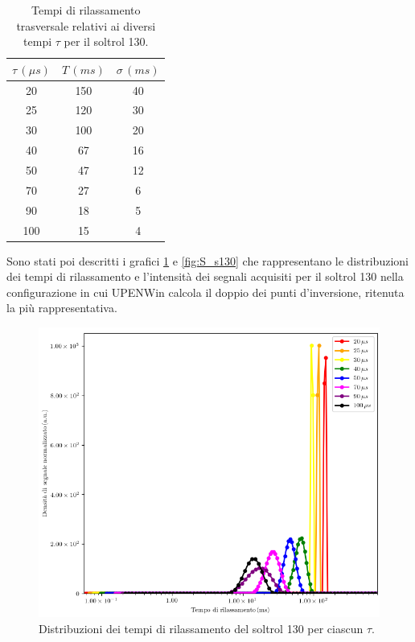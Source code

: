 \begin{table}
    \begin{center}
    \begin{tabular}{c c c}
    \toprule
    	${\tau}\,({\mu}s)$ & $T\,(ms)$ & ${\sigma}\,(ms)$ \\
    \midrule
	 20 & 150 & 40 \\
	 25 & 120 & 30 \\
	 30 & 100 & 20 \\
	 40 & 67 & 16 \\
	 50 & 47 & 12 \\
	 70 & 27 & 6 \\
	 90 & 18 & 5 \\
	 100 & 15 & 4 \\
    \bottomrule
    \end{tabular}
    \caption{Tempi di rilassamento trasversale relativi ai diversi tempi $\tau$ per il soltrol 130.}
    \label{tab:T_s130}
    \end{center}
\end{table}
\newpage
Sono stati poi descritti i grafici \ref{fig:D_s130} e \ref{fig:S_s130} che rappresentano le distribuzioni dei tempi di rilassamento e l'intensità dei segnali acquisiti per il soltrol 130 nella configurazione in cui UPENWin calcola il doppio dei punti d'inversione, ritenuta la più rappresentativa.

\begin{figure}[p]
\centering
\includegraphics[width=\columnwidth]{Figure/SOLTROL130.png}
\caption{Distribuzioni dei tempi di rilassamento del soltrol 130 per ciascun $\tau$.}
\label{fig:D_s130}
\end{figure}

